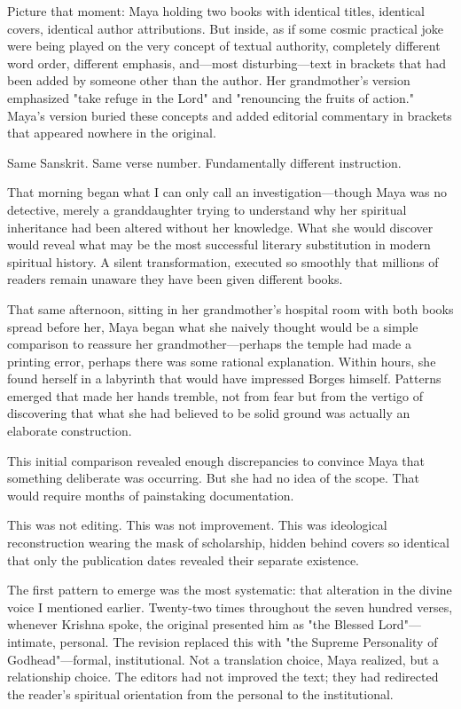 \documentclass[12pt,twoside]{book}
\begin{document}
Picture that moment: Maya holding two books with identical titles, identical covers, identical author attributions. But inside, as if some cosmic practical joke were being played on the very concept of textual authority, completely different word order, different emphasis, and—most disturbing—text in brackets that had been added by someone other than the author. Her grandmother's version emphasized "take refuge in the Lord" and "renouncing the fruits of action." Maya's version buried these concepts and added editorial commentary in brackets that appeared nowhere in the original.

Same Sanskrit. Same verse number. Fundamentally different instruction.

That morning began what I can only call an investigation—though Maya was no detective, merely a granddaughter trying to understand why her spiritual inheritance had been altered without her knowledge. What she would discover would reveal what may be the most successful literary substitution in modern spiritual history. A silent transformation, executed so smoothly that millions of readers remain unaware they have been given different books.

That same afternoon, sitting in her grandmother's hospital room with both books spread before her, Maya began what she naively thought would be a simple comparison to reassure her grandmother—perhaps the temple had made a printing error, perhaps there was some rational explanation. Within hours, she found herself in a labyrinth that would have impressed Borges himself. Patterns emerged that made her hands tremble, not from fear but from the vertigo of discovering that what she had believed to be solid ground was actually an elaborate construction.

This initial comparison revealed enough discrepancies to convince Maya that something deliberate was occurring. But she had no idea of the scope. That would require months of painstaking documentation.

This was not editing. This was not improvement. This was ideological reconstruction wearing the mask of scholarship, hidden behind covers so identical that only the publication dates revealed their separate existence.

The first pattern to emerge was the most systematic: that alteration in the divine voice I mentioned earlier. Twenty-two times throughout the seven hundred verses, whenever Krishna spoke, the original presented him as "the Blessed Lord"—intimate, personal. The revision replaced this with "the Supreme Personality of Godhead"—formal, institutional. Not a translation choice, Maya realized, but a relationship choice. The editors had not improved the text; they had redirected the reader's spiritual orientation from the personal to the institutional.
\end{document}
